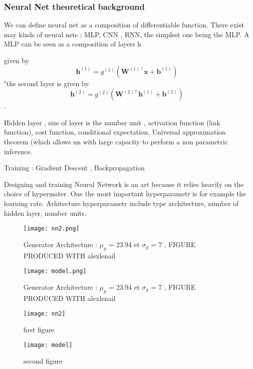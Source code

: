 \documentclass{article}
\begin{document}
\subsubsection{Neural Net theoretical background }

We can define neural net as a composition of differentiable function. There exist may kinds of neural nets : MLP, CNN , RNN, the simplest one being the MLP. 
A MLP can be seen as a composition of layers h 

 given by
$$
\boldsymbol{h}^{(1)}=g^{(1)}\left(\boldsymbol{W}^{(1) \top} \boldsymbol{x}+\boldsymbol{b}^{(1)}\right)
$$
"the second layer is given by
$$
\boldsymbol{h}^{(2)}=g^{(2)}\left(\boldsymbol{W}^{(2) \top} \boldsymbol{h}^{(1)}+\boldsymbol{b}^{(2)}\right)
$$.

Hidden layer , size of layer is the number unit , activation function (link function), 
cost function, conditional expectation, Universal approximation theorem (which allows nn with large capacity to perform a non parametric inference.

Training : Gradient Descent , Backpropagation

Designing and training Neural Network is an art because it relies heavily on the choice of hypermater. One the most important hyperparametr is for example the learning rate. Arhitecture hyperparametr include type architecture, number of hidden layer, number units. 

\begin{figure} [H]
  \texttt{[image: nn2.png]}
\caption{ Generator Architecture  : $\mu_{g}$ = 23.94 et $\sigma_{g}$ = 7 , FIGURE PRODUCED WITH alexlenail }
\end{figure}


\begin{figure} [H]
  \texttt{[image: model.png]}
\caption{ Generator Architecture  : $\mu_{g}$ = 23.94 et $\sigma_{g}$ = 7 , FIGURE PRODUCED WITH alexlenail }
\end{figure}




\begin{figure}  [H]
    \centering
    \begin{minipage}{0.6\textwidth}
        \centering
        \texttt{[image: nn2]} %
        \caption{first figure}
    \end{minipage}\hfill
    \begin{minipage}{0.4\textwidth}
        \centering
        \texttt{[image: model]} %
        \caption{second figure}
    \end{minipage}
\end{figure}
\end{document}
